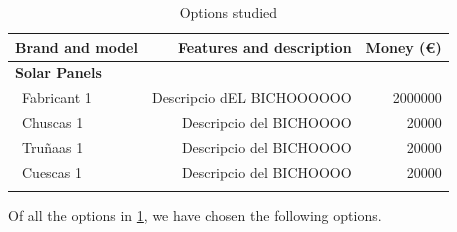 \begin{longtable}{| l | r | r | }
\hline
\rowcolor[gray]{0.80}	\textbf{Brand and model} &  \textbf{Features and description}     & \textbf{Money (\euro)}   \\
\hline
\endfirsthead

\rowcolor[gray]{0.85} \textbf{Solar Panels} &  &  \\
	   ~Fabricant 1 & Descripcio dEL BICHOOOOOO & 2000000 \\
	   ~Chuscas 1 & Descripcio del BICHOOOO & 20000 \\
	   ~Truñaas 1 & Descripcio del BICHOOOO & 20000 \\
	   ~Cuescas 1 & Descripcio del BICHOOOO & 20000 \\
	\hline

\caption{Options studied}
\label{epsoptionstable}
\end{longtable}

Of all the options in \ref{epsoptionstable}, we have chosen the following options.
